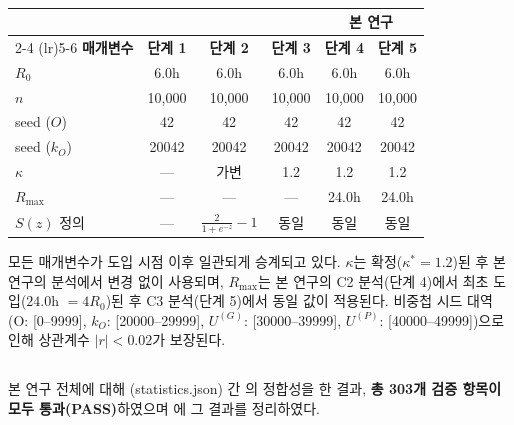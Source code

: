 \begin{table}[htbp]
  \centering
  \caption{}
  \label{tab:param_inheritance}
  \small
  \begin{tabular}{l ccc cc}
    \toprule
    & \multicolumn{3}{c}{\textbf{\citet{lee2026drto}}} & \multicolumn{2}{c}{\textbf{본 연구}} \\
    \cmidrule(lr){2-4} \cmidrule(lr){5-6}
    \textbf{매개변수} & \textbf{단계 1} & \textbf{단계 2} & \textbf{단계 3} & \textbf{단계 4} & \textbf{단계 5} \\
    \midrule
    $R_0$ & 6.0h & 6.0h & 6.0h & 6.0h & 6.0h \\
    $n$ & 10,000 & 10,000 & 10,000 & 10,000 & 10,000 \\
    seed ($O$) & 42 & 42 & 42 & 42 & 42 \\
    seed ($k_O$) & 20042 & 20042 & 20042 & 20042 & 20042 \\
    $\kappa$ & --- & 가변 & 1.2 & 1.2 & 1.2 \\
    $R_{\max}$ & --- & --- & --- & 24.0h & 24.0h \\
    $S(z)$ 정의 & --- & $\frac{2}{1+e^{-z}}-1$ & 동일 & 동일 & 동일 \\
    \bottomrule
  \end{tabular}
\end{table}

모든 매개변수가 도입 시점 이후 일관되게 승계되고 있다.
$\kappa$는  확정($\kappa^* = 1.2$)된 후
본 연구의  분석에서 변경 없이 사용되며,
$R_{\max}$는 본 연구의 C2 분석(단계 4)에서 최초 도입($24.0$h $= 4R_0$)된 후
C3 분석(단계 5)에서 동일 값이 적용된다.
비중첩 시드 대역(O: [0--9999], $k_O$: [20000--29999], $U^{(G)}$: [30000--39999],
$U^{(P)}$: [40000--49999])으로 인해 상관계수 $|r| < 0.02$가 보장된다.


\subsection{}
\label{subsec:comprehensive_pass}

본 연구 전체에 대해 (statistics.json)
간 의 정합성을 한 결과,
\textbf{총 303개 검증 항목이 모두 통과(PASS)}하였으며 에 그 결과를 정리하였다.

